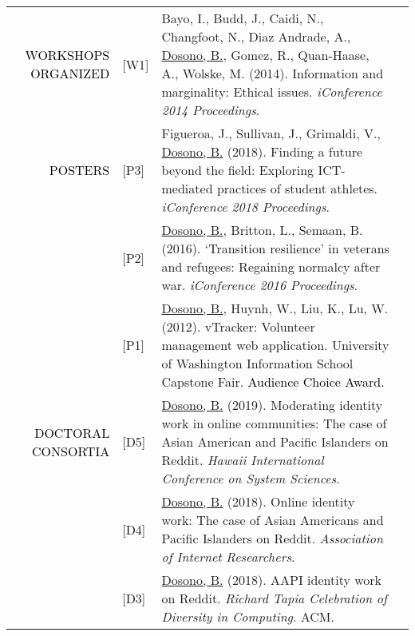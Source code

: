 \documentclass[12pt]{article}
\begin{document}
{{\begin{longtable}{Rp{1.0in}p{0.25in}p{4.75in}}
\textcolor{black}{\footnotesize{\uppercase{Workshops Organized}}} & \footnotesize{[W1]} & Bayo, I., Budd, J., Caidi, N., Changfoot, N., Diaz Andrade, A., \href{http://www.ideals.illinois.edu/handle/2142/47393}{{Dosono, B.}}, Gomez, R., Quan-Haase, A., Wolske, M. (2014). Information and marginality: Ethical issues. \textit{iConference 2014 Proceedings}. \\

\textcolor{black}{\footnotesize{\uppercase{Posters}}} & \footnotesize{[P3]} & Figueroa, J., Sullivan, J., Grimaldi, V., \href{https://www.ideals.illinois.edu/handle/2142/100251}{{Dosono, B.}} (2018). Finding a future beyond the field: Exploring ICT-mediated practices of student athletes. \textit{iConference 2018 Proceedings}. \\

& \footnotesize{[P2]} & \href{http://hdl.handle.net/2142/89348}{{Dosono, B.}}, Britton, L., Semaan, B. (2016). ‘Transition resilience’ in veterans and refugees: Regaining normalcy after war. \textit{iConference 2016 Proceedings}. \\

& \footnotesize{[P1]} & \href{http://youtu.be/i5US90lHIac}{{Dosono, B.}}, Huynh, W., Liu, K., Lu, W. (2012). vTracker: Volunteer management web application. University of Washington Information School Capstone Fair. \textcolor{black}{Audience Choice Award.} \\

\textcolor{black}{\footnotesize{\uppercase{Doctoral Consortia}}} & \footnotesize{[D5]} & 
 \href{http://hicss.hawaii.edu/doctoral-consortium/}{{Dosono, B.}} (2019). Moderating identity work in online communities: The case of Asian American and Pacific Islanders on Reddit. \textit{Hawaii International Conference on System Sciences}. \\

& \footnotesize{[D4]} & \href{https://aoir.org/}{{Dosono, B.}} (2018). Online identity work: The case of Asian Americans and Pacific Islanders on Reddit. \textit{Association of Internet Researchers}. \\

& \footnotesize{[D3]} & \href{http://tapiaconference.org/schedule/wednesday-september-19-2018/100pm-500pm/doctoral-consortium/aapi-identity-work-on-reddit-toward-social-support-and-collective-action/}{{Dosono, B.}} (2018). AAPI identity work on Reddit. \textit{Richard Tapia Celebration of Diversity in Computing}. ACM. \\


\end{longtable}}}
\end{document}
